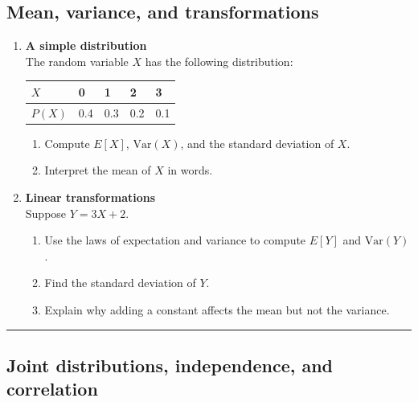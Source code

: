 \documentclass[
  letterpaper,
  DIV=11,
  numbers=noendperiod]{scrreprt}
\providecommand{\tightlist}{%
  \setlength{\itemsep}{0pt}\setlength{\parskip}{0pt}}
\begin{document}
\subsection{Mean, variance, and
transformations}\label{mean-variance-and-transformations}

\begin{enumerate}
\def\labelenumi{\arabic{enumi}.}
\setcounter{enumi}{2}
\item
  \textbf{A simple distribution}\\
  The random variable \(X\) has the following distribution:

  \begin{longtable}[]{@{}lllll@{}}
  \toprule\noalign{}
  \(X\) & 0 & 1 & 2 & 3 \\
  \midrule\noalign{}
  \endhead
  \bottomrule\noalign{}
  \endlastfoot
  \(P(X)\) & 0.4 & 0.3 & 0.2 & 0.1 \\
  \end{longtable}

  \begin{enumerate}
  \def\labelenumii{(\alph{enumii})}
  \tightlist
  \item
    Compute \(E[X]\), \(\text{Var}(X)\), and the standard deviation of
    \(X\).\\
  \item
    Interpret the mean of \(X\) in words.
  \end{enumerate}
\item
  \textbf{Linear transformations}\\
  Suppose \(Y = 3X + 2\).

  \begin{enumerate}
  \def\labelenumii{(\alph{enumii})}
  \tightlist
  \item
    Use the laws of expectation and variance to compute \(E[Y]\) and
    \(\text{Var}(Y)\).\\
  \item
    Find the standard deviation of \(Y\).\\
  \item
    Explain why adding a constant affects the mean but not the variance.
  \end{enumerate}
\end{enumerate}

\begin{center}\rule{0.5\linewidth}{0.5pt}\end{center}

\subsection{Joint distributions, independence, and
correlation}\label{joint-distributions-independence-and-correlation}
\end{document}
